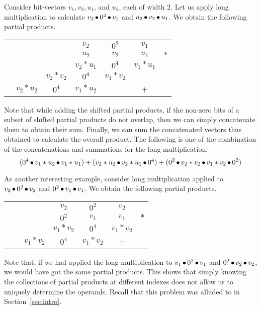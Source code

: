 \begin{example}
  Consider bit-vectors $v_1,v_2,u_1$, and $u_2$, each of width 2.
  Let us apply long multiplication to calculate
  $v_2 \mathop{\bullet} 0^2 \mathop{\bullet} v_1$ and $u_2 \mathop{\bullet} v_2 \mathop{\bullet} u_1$.
  We obtain the following partial products.
\begin{center}
\begin{tabular}{c@{\quad}c@{\quad}c@{\quad}c@{\quad}c@{\quad}c@{\quad}c}
  &&& $v_2$ & $0^2$ & $v_1$&\\ 
  &&& $u_2$ & $v_2$ & $u_1$&$*$\\ \hline
  &&&$v_2*u_1$& $0^4$ & $v_1*u_1$&\\
  &&$v_2*v_2$&$0^4$& $v_1*v_2$ && \\
  &$v_2*u_2$& $0^4$ &$v_1*u_2$&  & +&\\\hline
\end{tabular}
\end{center}
Note that while adding the shifted partial products, if the non-zero bits of a
subset of shifted partial products do not overlap, then we can simply concatenate
them to obtain their sum. Finally, we can sum the concatenated vectors thus
obtained to calculate the overall product. The following is one of the combination
of the concatenations and summations for the long multiplication.
%
%
$$
( 0^4 \mathop{\bullet} v_1*u_2 \mathop{\bullet} v_1*u_1) +
(v_2*u_2 \mathop{\bullet} v_2*u_1 \mathop{\bullet} 0^4) +
(0^2 \mathop{\bullet} v_2*v_2 \mathop{\bullet} v_1*v_2 \mathop{\bullet} 0^2)
$$
\end{example}


\begin{example}

  As another interesting example, consider long multiplication applied to 
  $v_2 \mathop{\bullet} 0^2 \mathop{\bullet} v_2$ and $0^2 \mathop{\bullet} v_1 \mathop{\bullet} v_1$.
  We obtain the following partial products.
\begin{center}
\begin{tabular}{c@{\quad}c@{\quad}c@{\quad}c@{\quad}c@{\quad}c@{\quad}c}
  &&& $v_2$ & $0^2$ & $v_2$&\\ 
  &&& $0^2$ & $v_1$ & $v_1$&$*$\\ \hline
  &&&$v_1*v_2$& $0^4$ & $v_1*v_2$&\\
  &&$v_1*v_2$&$0^4$& $v_1*v_2$ &+&\\\hline
\end{tabular}
\end{center}
Note that, if we had applied the long multiplication to $v_1 \mathop{\bullet}
0^2 \mathop{\bullet} v_1$ and $0^2 \mathop{\bullet} v_2 \mathop{\bullet} v_2$, we would have got
the same partial products. This shows that simply knowing the
collections of partial products at different indexes does not allow us
to uniquely determine the operands. Recall that this problem was
alluded to in Section~\ref{sec:intro}.

\end{example}


